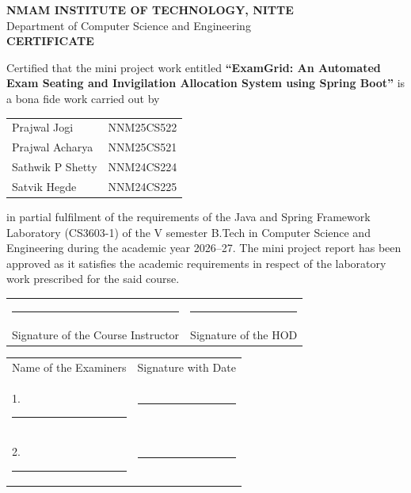 \documentclass[12pt,a4paper,oneside]{report}
\begin{document}

\thispagestyle{plain}
\begin{center}
{\large\bfseries NMAM INSTITUTE OF TECHNOLOGY, NITTE}\\[2pt]
Department of Computer Science and Engineering\\[1.2cm]
{\Large\bfseries\color{egnavy} CERTIFICATE}
\end{center}
\vspace{0.6cm}
\noindent Certified that the mini project work entitled \textbf{``ExamGrid: An Automated Exam Seating and Invigilation Allocation System using Spring Boot''} is a bona fide work carried out by
\begin{center}
\begin{tabular}{l l}
Prajwal Jogi & NNM25CS522\\
Prajwal Acharya & NNM25CS521\\
Sathwik P Shetty & NNM24CS224\\
Satvik Hegde & NNM24CS225\\
\end{tabular}
\end{center}
\noindent in partial fulfilment of the requirements of the Java and Spring Framework Laboratory (CS3603-1) of the V semester B.Tech in Computer Science and Engineering during the academic year 2026--27. The mini project report has been approved as it satisfies the academic requirements in respect of the laboratory work prescribed for the said course.
\vspace{2.5cm}

\noindent\begin{tabular}{@{}p{7cm}p{7cm}@{}}
\rule{5cm}{0.4pt} & \rule{5cm}{0.4pt}\\
Signature of the Course Instructor & Signature of the HOD\\
\end{tabular}
\vspace{2cm}

\noindent\begin{tabular}{@{}p{7cm}p{7cm}@{}}
Name of the Examiners & Signature with Date\\[0.8cm]
1. \rule{5cm}{0.4pt} & \rule{5cm}{0.4pt}\\[0.8cm]
2. \rule{5cm}{0.4pt} & \rule{5cm}{0.4pt}\\
\end{tabular}
\newpage
\end{document}
